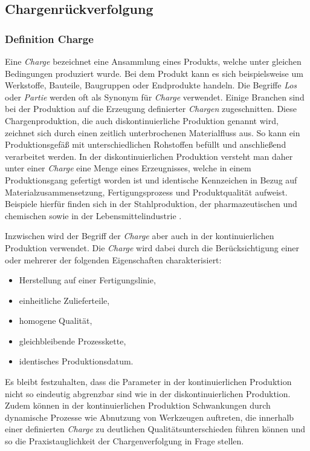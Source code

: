 \subsection{Chargenrückverfolgung}

\subsubsection{Definition Charge}

Eine \textit{Charge} bezeichnet eine Ansammlung eines Produkts, welche unter gleichen Bedingungen produziert wurde. Bei dem Produkt kann es sich beispielsweise um Werkstoffe, Bauteile, Baugruppen oder Endprodukte handeln. Die Begriffe \textit{Los} oder \textit{Partie} werden oft als Synonym für \textit{Charge} verwendet. Einige Branchen sind bei der Produktion auf die Erzeugung definierter \textit{Chargen} zugeschnitten. Diese Chargenproduktion, die auch diskontinuierliche Produktion genannt wird, zeichnet sich durch einen zeitlich unterbrochenen Materialfluss aus. So kann ein Produktionsgefäß mit unterschiedlichen Rohstoffen befüllt und anschließend verarbeitet werden. In der diskontinuierlichen Produktion versteht man daher unter einer \textit{Charge} eine Menge eines Erzeugnisses, welche in einem Produktionsgang gefertigt worden ist und identische Kennzeichen in Bezug auf Materialzusammensetzung, Fertigungsprozess und Produktqualität aufweist. Beispiele hierfür finden sich in der Stahlproduktion, der pharmazeutischen und chemischen sowie in der Lebensmittelindustrie \citep{Guenther2012}.

Inzwischen wird der Begriff der \textit{Charge} aber auch in der kontinuierlichen Produktion verwendet. Die \textit{Charge} wird dabei durch die Berücksichtigung einer oder mehrerer der folgenden Eigenschaften charakterisiert:

\begin{itemize}
  \item Herstellung auf einer Fertigungslinie,
  \item einheitliche Zulieferteile,
  \item homogene Qualität,
  \item gleichbleibende Prozesskette,
  \item identisches Produktionsdatum.
\end{itemize}

Es bleibt festzuhalten, dass die Parameter in der kontinuierlichen Produktion nicht so eindeutig abgrenzbar sind wie in der diskontinuierlichen Produktion. Zudem können in der kontinuierlichen Produktion Schwankungen durch dynamische Prozesse wie Abnutzung von Werkzeugen auftreten, die innerhalb einer definierten \textit{Charge} zu deutlichen Qualitätsunterschieden führen können und so die Praxistauglichkeit der Chargenverfolgung in Frage stellen.

